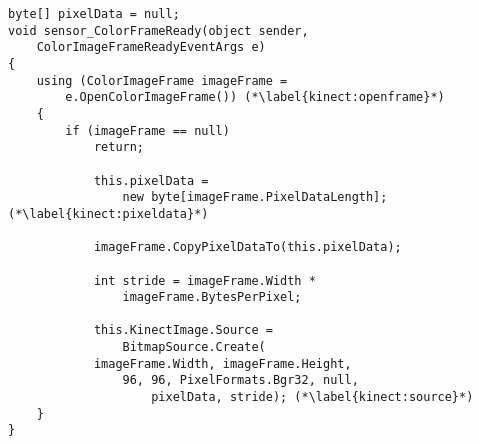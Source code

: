 \begin{lstlisting}[style=csharp,caption={Visning af billeddata fra Kinectens RGB-kamera.}, label=kinect:picture]
byte[] pixelData = null;
void sensor_ColorFrameReady(object sender,
	ColorImageFrameReadyEventArgs e)
{
    using (ColorImageFrame imageFrame = 
    	e.OpenColorImageFrame()) (*\label{kinect:openframe}*)
    {
        if (imageFrame == null)
            return;

            this.pixelData = 
            	new byte[imageFrame.PixelDataLength];(*\label{kinect:pixeldata}*)

            imageFrame.CopyPixelDataTo(this.pixelData);

            int stride = imageFrame.Width *
            	imageFrame.BytesPerPixel;

            this.KinectImage.Source = 
            	BitmapSource.Create(
            imageFrame.Width, imageFrame.Height, 
            	96, 96, PixelFormats.Bgr32, null, 
            		pixelData, stride); (*\label{kinect:source}*)
    }
}    
\end{lstlisting}